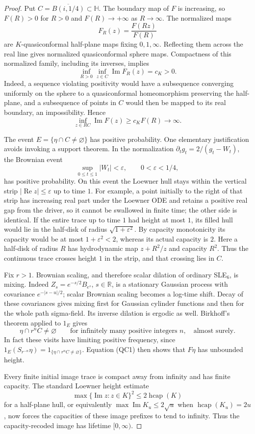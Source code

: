 \documentclass[11pt]{article}
\theoremstyle{definition}\newtheorem{definition}[theorem]{Definition}
\theoremstyle{remark}\newtheorem{remark}[theorem]{Remark}
\begin{document}
\begin{proof}
Put $C=\overline{B(i,1/4)}\subset\mathbb H$.  The boundary map of $F$
is increasing, so $F(R)>0$ for $R>0$ and $F(R)\to+\infty$ as
$R\to\infty$.  The normalized maps
\[
 F_R(z)=\frac{F(Rz)}{F(R)}
\]
are $K$-quasiconformal half-plane maps fixing $0,1,\infty$.
Reflecting them across the real line gives normalized quasiconformal sphere
maps.  Compactness of this normalized family, including its inverses,
implies
\[
 \inf_{R>0}\inf_{z\in C}\operatorname{Im}F_R(z)=c_K>0.
\]
Indeed, a sequence violating positivity would have a subsequence converging
uniformly on the sphere to a quasiconformal homeomorphism preserving the
half-plane, and a subsequence of points in $C$ would then be mapped to its
real boundary, an impossibility.  Hence
\[
 \inf_{z\in RC}\operatorname{Im}F(z)\geq c_K F(R)
       \longrightarrow\infty.
 \tag{QC1}
\]

The event $E=\{\eta\cap C\ne\varnothing\}$ has positive probability.
One elementary justification avoids invoking a support theorem.  In the
normalization $\partial_tg_t=2/(g_t-W_t)$, the Brownian event
\[
 \sup_{0\leq t\leq1}|W_t|<\varepsilon,
       \qquad 0<\varepsilon<1/4,
\]
has positive probability.  On this event the Loewner hull stays within the
vertical strip $|\operatorname{Re}z|\leq\varepsilon$ up to time $1$.
For example, a point initially to the right of that strip has increasing
real part under the Loewner ODE and retains a positive real gap from the
driver, so it cannot be swallowed in finite time; the other side is
identical.  If the entire trace up to time $1$ had height at most $1$, its
filled hull would lie in the half-disk of radius
$\sqrt{1+\varepsilon^2}$.  By capacity monotonicity its capacity would be
at most $1+\varepsilon^2<2$, whereas its actual capacity is $2$.
Here a half-disk of radius $R$ has hydrodynamic map $z+R^2/z$ and
capacity $R^2$.  Thus the continuous trace crosses height $1$ in the strip,
and that crossing lies in $C$.

Fix $r>1$.  Brownian scaling, and therefore scalar dilation of ordinary
SLE$_6$, is mixing.  Indeed $Z_s=e^{-s/2}B_{e^s}$, $s\in\mathbb R$,
is a stationary Gaussian process with covariance $e^{-|s-u|/2}$; scalar
Brownian scaling becomes a log-time shift.  Decay of these covariances
gives mixing first for Gaussian cylinder functions and then for the whole
path sigma-field.  Its inverse dilation is ergodic as well.  Birkhoff's
theorem applied to $1_E$ gives
\[
 \eta\cap r^nC\ne\varnothing
       \qquad\text{for infinitely many positive integers }n,
       \quad\text{almost surely}.
\]
In fact these visits have limiting positive frequency, since
$1_E(S_{r^{-n}}\eta)=1_{\{\eta\cap r^nC\ne\varnothing\}}$.
Equation (QC1) then shows that $F\eta$ has unbounded height.

Every finite initial image trace is compact away from infinity and has
finite capacity.  The standard Loewner height estimate
\[
 \max\{\operatorname{Im}z:z\in K\}^2
       \leq2\operatorname{hcap}(K)
\]
for a half-plane hull, or equivalently
$\max\operatorname{Im}K_u\leq2\sqrt u$ when
$\operatorname{hcap}(K_u)=2u$, now forces the capacities of these image
prefixes to tend to infinity.  Thus the capacity-recoded image has lifetime
$[0,\infty)$.
\end{proof}
\end{document}
